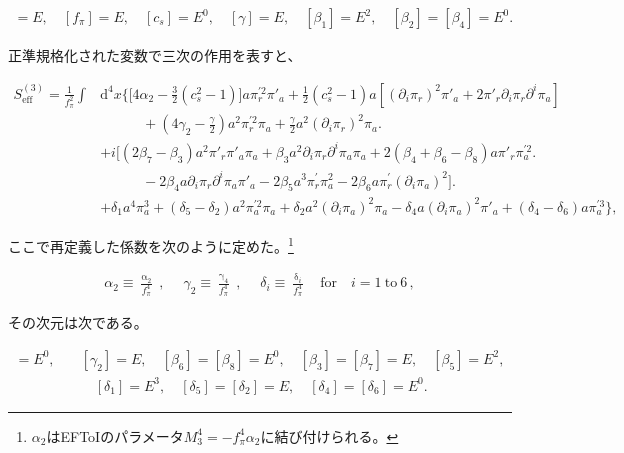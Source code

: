 \documentclass[a4paper,11pt]{ltjsarticle}
\numberwithin{equation}{section}
\def\pia{\pi_{a}}
\def\pir{\pi_{r}}
\newcommand{\dd}{\mathrm{d}}
\begin{document}
\begin{align}
[\pi] = E, \quad [f_\pi] = E, \quad [c_s] = E^0, \quad [\gamma] = E, \quad [\beta_1] = E^2, \quad [\beta_2] = [\beta_4] = E^0.
\end{align}

正準規格化された変数で三次の作用を表すと、

\begin{align}\label{eq:canonormcub}
S_{\mathrm{eff}}^{(3)} =   \frac{1}{f_\pi^2} \int & \dd^4 x \Big\{\Big[4 \alpha_2 -  \frac{3}{2} (c^2_s-1) \Big]  a \pir^{\prime2} \pi'_{a} +\frac{1}{2} (c^2_s-1) a \left[\left(\partial_i \pir \right)^2 \pi'_a + 2 \pi'_{r}	\partial_i \pir  \partial^i \pia \right] \\
& \qquad \quad + \left(4 \gamma_2 - \frac{\gamma}{2}\right)  a^2\pir^{\prime2} \pia	+ \frac{\gamma}{2} a^2	\left(\partial_i \pir \right)^2 \pia \nonumber \Big. \\
&+ i \Big[\left(2\beta_7-\beta_3\right) a^2 \pi'_{r} \pi'_{a} \pia + \beta_3 a^2 \partial_i \pir  \partial^i \pia \pia + 2(\beta_4+ \beta_6 - \beta_8) a \pi'_{r} \pia^{\prime2} \Big. \nonumber \\
& \qquad \quad - 2 \beta_4  a \partial_i \pir  \partial^i \pia \pi'_{a} - 2\beta_5 a^3 \pir^{\prime} \pia^2  - 2 \beta_6 a \pir^{\prime} (\partial_i\pia)^2 \Big]  \Big. \nonumber\\
&+\delta_1 a^4 \pia^3 + (\delta_5- \delta_2) a^2 \pia^{\prime2} \pia  + \delta_2 a^2 (\partial_i \pia)^2 \pia - \delta_4 a  (\partial_i \pia)^2 \pi'_a + (\delta_4-\delta_6) a \pia^{\prime3} \Big\},  \nonumber
\end{align}

ここで再定義した係数を次のように定めた。\footnote{$\alpha_2$はEFToI\cite{Cheung:2007st}のパラメータ$M_3^4=-f_\pi^4\alpha_2$に結び付けられる。}

\begin{align}
\alpha_2 \equiv \frac{\upalpha_2}{f_\pi^4}\;,\quad\; \gamma_2 \equiv \frac{\upgamma_{4}}{f_\pi^4} \;,\quad\; \delta_i \equiv \frac{\updelta_{i}}{f_\pi^4} \quad\mathrm{for}\quad i = 1 ~\mathrm{to}~6\,,
\end{align}

その次元は次である。

\begin{align}
[\alpha_2] = E^{0}, &\quad [\gamma_2] = E, \quad [\beta_6] =  [\beta_8] = E^0, \quad [\beta_3] = [\beta_7] = E, \quad [\beta_5] = E^2, \nonumber \\
& \qquad  [\delta_1] = E^3, \quad [\delta_5] = [\delta_2] = E, \quad [\delta_4] = [\delta_6] = E^0  . 
\end{align}
\end{document}
